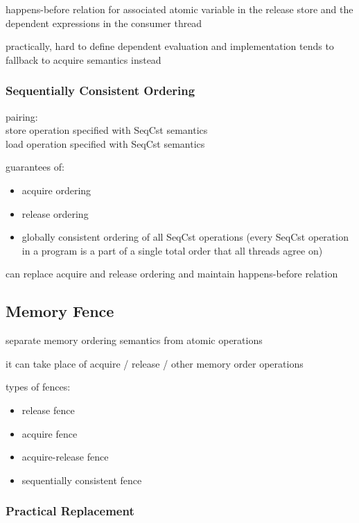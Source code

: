 \documentclass[8pt]{extarticle}
\begin{document}
\begin{multicols*}{2}
    happens-before relation for associated atomic variable in the release store and the dependent expressions in the consumer thread

    practically, hard to define dependent evaluation and implementation tends to fallback to acquire semantics instead
    
    \subsubsection{Sequentially Consistent Ordering}

    pairing:\\
    store operation specified with SeqCst semantics\\
    load operation specified with SeqCst semantics

    guarantees of:
    \begin{itemize}
    \item acquire ordering
    \item release ordering
    \item globally consistent ordering of all SeqCst operations (every SeqCst operation in a program is a part of a single total order that all threads agree on)
    \end{itemize}

    can replace acquire and release ordering and maintain happens-before relation
    
    \subsection{Memory Fence}

    separate memory ordering semantics from atomic operations

    it can take place of acquire / release / other memory order operations

    types of fences:
    \begin{itemize}
    \item release fence
    \item acquire fence
    \item acquire-release fence
    \item sequentially consistent fence
    \end{itemize}
      
    \subsubsection{Practical Replacement}
    

\end{multicols*}
\end{document}
